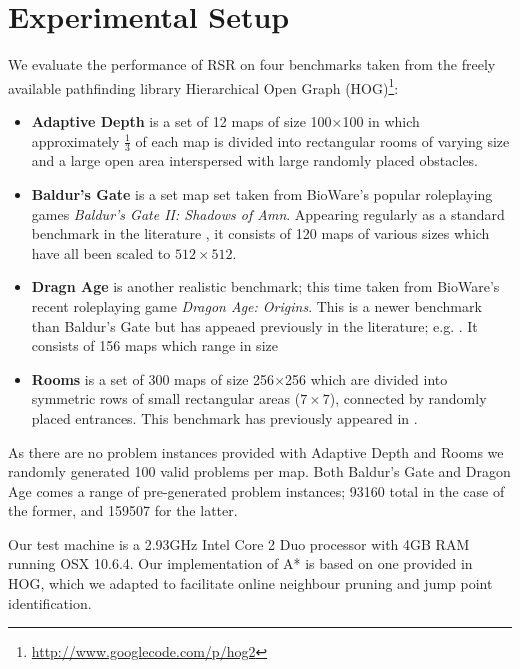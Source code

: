 \section{Experimental Setup}
We evaluate the performance of RSR on four benchmarks taken from the freely
available pathfinding library Hierarchical Open Graph
(HOG)\footnote{\url{http://www.googlecode.com/p/hog2}}: 
\begin{itemize}

\item{\textbf{Adaptive Depth}
is a set of 12 maps of size 100$\times$100 in which approximately $\frac{1}{3}$
of each map is divided into rectangular rooms of varying size and a large
open area interspersed with large randomly placed obstacles.
} 

\item{\textbf{Baldur's Gate} is a set map set taken from BioWare's popular
roleplaying games \emph{Baldur's Gate II: Shadows of Amn}.
Appearing regularly as a standard benchmark in the literature
\cite{bjornsson06,harabor10,pochter10}, 
it consists of 120 maps of various sizes which have all been scaled to
$512\times512$. 
}

\item{\textbf{Dragn Age} is another realistic benchmark; this time taken from
BioWare's recent roleplaying game \emph{Dragon Age: Origins}.
This is a newer benchmark than Baldur's Gate but has appeaed previously in the
literature; e.g. \cite{sturtevant07}. It consists of 156 maps which range in size
}


\item{\textbf{Rooms} is a set of 300 maps of size
256$\times$256 which are divided into symmetric rows of small rectangular areas
($7\times7$), connected by randomly placed entrances. This benchmark has
previously appeared in \cite{pochter10}.
}
\end{itemize}

As there are no problem instances provided with Adaptive Depth and Rooms
we randomly generated 100 valid problems per map.
Both Baldur's Gate and Dragon Age comes a range of pre-generated problem 
instances; 93160 total in the case of the former, and 159507 for the latter. 
\par
Our test machine is a 2.93GHz Intel Core 2 Duo processor with 4GB RAM running OSX 
10.6.4.  Our implementation of A* is based on one provided in HOG, which we 
adapted to facilitate online neighbour pruning and jump point identification. 
